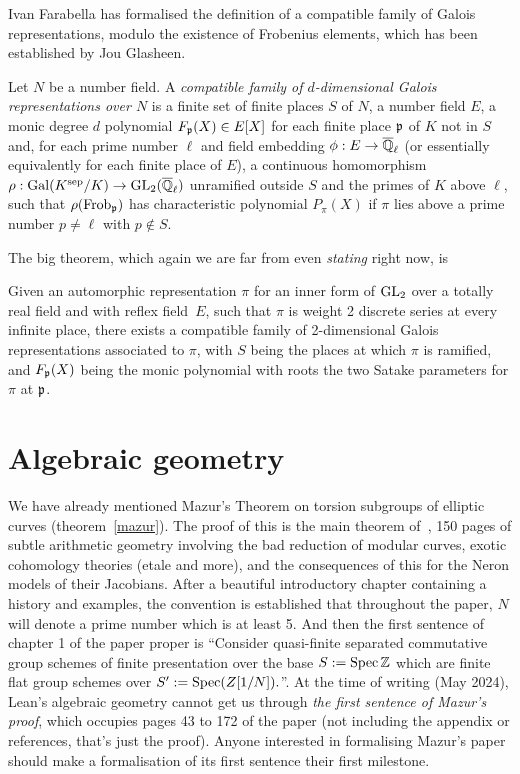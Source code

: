 Ivan Farabella has formalised the definition of a compatible family of Galois
representations, modulo the existence of Frobenius elements, which has been
established by Jou Glasheen. 

\begin{definition}\label{compatible_family} Let $N$ be a number field. A \emph{compatible family of $d$-dimensional Galois representations over $N$} is a finite set of finite places $S$ of $N$,
a number field $E$, a monic degree $d$ polynomial $F_{{\mathfrak{p}}}(X)\in E[X]$ for each finite place ${\mathfrak{p}}$ of $K$ not in $S$ and, for each prime number $\ell$ and field embedding $\phi : E\to\overline{\mathbb{Q}}_\ell$ (or essentially equivalently for each finite place of $E$), a continuous homomorphism $\rho:\operatorname{Gal}(K^{\operatorname{sep}}/K)\to\operatorname{GL}_2(\overline{\mathbb{Q}}_\ell)$ unramified outside $S$ and the primes of $K$ above $\ell$, such that $\rho(\operatorname{Frob}_{\mathfrak{p}})$ has characteristic polynomial $P_\pi(X)$ if $\pi$ lies above a prime number $p\not=\ell$ with $p\not\in S$.
\end{definition}

The big theorem, which again we are far from even \emph{stating} right now, is

\begin{theorem}\label{Galois_representation_from_automorphic_representation_on_GL_2_form}\notready Given an automorphic representation $\pi$ for an inner form of $\operatorname{GL}_2$ over a totally real field and with reflex field~$E$, such that $\pi$ is weight 2 discrete series at every infinite place, there exists a compatible family of 2-dimensional Galois representations associated to $\pi$, with $S$ being the places at which $\pi$ is ramified, and $F_{{\mathfrak{p}}}(X)$ being the monic polynomial with roots the two Satake parameters for $\pi$ at ${\mathfrak{p}}$.
\end{theorem}

\section{Algebraic geometry}

We have already mentioned Mazur's Theorem on torsion subgroups of elliptic curves (theorem~\ref{mazur}).
The proof of this is the main theorem of~\cite{mazur-torsion}, 150 pages of subtle arithmetic
geometry involving the bad reduction of modular curves, exotic cohomology theories (etale and more),
and the consequences of this for the Neron models of their Jacobians. After a beautiful 
introductory chapter containing a history and examples, the convention is established that 
throughout the paper, $N$ will denote a prime number which is at least 5. And then the first 
sentence of chapter 1 of the paper proper is ``Consider quasi-finite separated commutative group 
schemes of finite presentation over the base $S:=\operatorname{Spec}{\mathbb{Z}}$ which are finite flat group schemes 
over $S':=\operatorname{Spec}(Z[1/N]).$''. At the time of writing (May 2024), Lean's algebraic geometry cannot 
get us through \emph{the first sentence of Mazur's proof}, which occupies pages 43 to 172 of
the paper (not including the appendix or references, that's just the proof). Anyone interested
in formalising Mazur's paper should make a formalisation of its first sentence their first
milestone.

